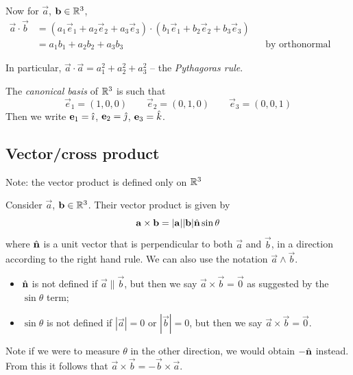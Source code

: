 \documentclass{../template/note}
\begin{document}
    Now for \(\vec a\), \(\vec b \in \RR^3\),
    \begin{align*}
        \vec a \cdot \vec b &= (a_1\vec e_1 + a_2 \vec e_2 + a_3\vec e_3) \cdot (b_1\vec e_1 + b_2 \vec e_2 + b_3\vec e_3) \\
        &= a_1b_1 + a_2b_2 + a_3b_3 && \text{by orthonormal basis}
    \end{align*}
    
    In particular, \(\vec a \cdot \vec a = a_1^2 + a_2^2 + a_3^2\) -- the \emph{Pythagoras rule}.

    The \emph{canonical basis} of \(\mathbb R^3\) is such that
    \[
        \vec e_1 = (1, 0, 0) \qquad \vec e_2 = (0, 1, 0) \qquad \vec e_3 = (0, 0, 1)
    \]
    Then we write \(\vec e_1 = \ihat\), \(\vec e_2 = \jhat\), \(\vec e_3 = \khat\).

    \subsection{Vector/cross product}

    Note: the vector product is defined only on \(\mathbb R^3\)

    \begin{definition}
        Consider \(\vec a\), \(\vec b \in \RR^3\). Their vector product is given by
        \[
            \vec a \times \vec b = |\vec a||\vec b| \hvec n \sin \theta 
        \]
        where \(\hvec n\) is a unit vector that is perpendicular to both \(\vec a\) and \(\vec b\), in a direction according to the right hand rule. We can also use the notation \(\vec a \wedge \vec b\).
    \end{definition}

    \begin{remark}
        \begin{itemize}
            \item \(\hvec n\) is not defined if \(\vec a \parallel \vec b\), but then we say \(\vec a \times \vec b = \vec 0\) as suggested by the \(\sin \theta\) term;
            \item \(\sin \theta\) is not defined if \(|\vec a| = 0\) or \(|\vec b| = 0\), but then we say \(\vec a \times \vec b = \vec 0\).
        \end{itemize}
        
        
    \end{remark}
    
    

    \begin{remark}
        Note if we were to measure \(\theta\) in the other direction, we would obtain \(-\hvec n\) instead. From this it follows that \(\vec a \times \vec b = - \vec b \times \vec a\).
    \end{remark}
\end{document}
